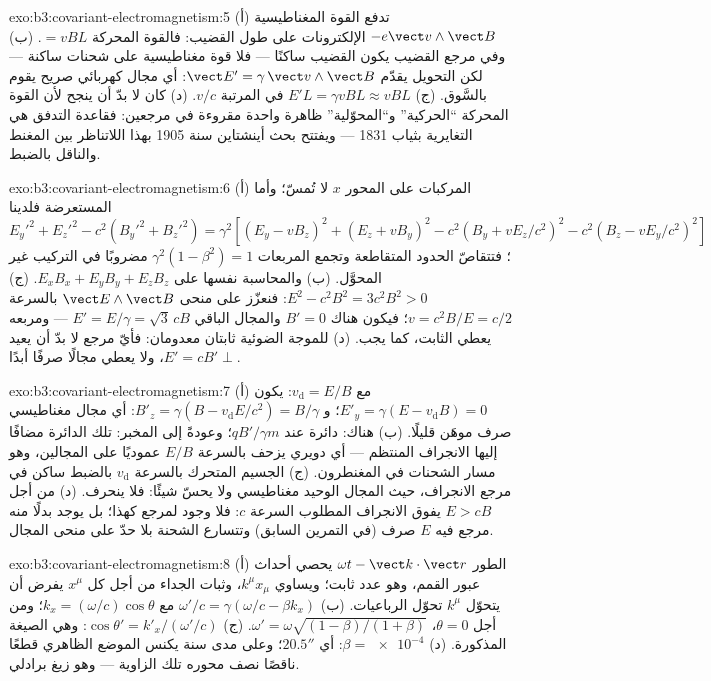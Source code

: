 \begin{solution}{exo:b3:covariant-electromagnetism:5}
(أ) تدفع القوة المغناطيسية $-e\vect v\wedge\vect B$ الإلكترونات
على طول القضيب: فالقوة المحركة $= vBL$. (ب) وفي مرجع القضيب يكون القضيب
ساكنًا --- فلا قوة مغناطيسية على شحنات ساكنة --- لكن
التحويل يقدّم $\vect E' = \gamma\,\vect v\wedge\vect B$:
أي مجال كهربائي صريح يقوم بالسَّوق. (ج) $E'L = \gamma vBL
\approx vBL$ في المرتبة $v/c$. (د) كان لا بدّ أن ينجح لأن القوة المحركة
``الحركية'' و``المحوّلية'' ظاهرة واحدة مقروءة في مرجعين:
فقاعدة التدفق هي التغايرية بثياب 1831 --- ويفتتح بحث أينشتاين
سنة 1905 بهذا اللاتناظر بين المغنط والناقل بالضبط.
\end{solution}

\begin{solution}{exo:b3:covariant-electromagnetism:6}
(أ) المركبات على المحور $x$ لا تُمسّ؛ وأما المستعرضة فلدينا
$E_y'^2 + E_z'^2 - c^2(B_y'^2 + B_z'^2) = \gamma^2[(E_y - vB_z)^2 +
(E_z + vB_y)^2 - c^2(B_y + vE_z/c^2)^2 - c^2(B_z - vE_y/c^2)^2]$؛
فتتقاصّ الحدود المتقاطعة وتجمع المربعات $\gamma^2(1 -
\beta^2) = 1$ مضروبًا في التركيب غير المحوَّل. (ب) والمحاسبة
نفسها على $E_xB_x + E_yB_y + E_zB_z$. (ج) $E^2 - c^2B^2 =
3c^2B^2 > 0$: فنعزّز على منحى $\vect E\wedge\vect B$ بالسرعة $v = c^2B/E =
c/2$؛ فيكون هناك $B' = 0$ والمجال الباقي $E' = E/\gamma =
\sqrt3\,cB$ --- ومربعه يعطي الثابت، كما يجب. (د) للموجة الضوئية ثابتان
معدومان: فأيّ مرجع لا بدّ أن يعيد $E' = cB' \perp$، ولا يعطي مجالًا صرفًا أبدًا.
\end{solution}

\begin{solution}{exo:b3:covariant-electromagnetism:7}
(أ) مع $v_{\text{d}} = E/B$: يكون $E'_y = \gamma(E - v_{\text{d}}B) =
0$؛ و $B'_z = \gamma(B - v_{\text{d}}E/c^2) = B/\gamma$: أي مجال
مغناطيسي صرف موهَن قليلًا. (ب) هناك: دائرة عند $qB'/\gamma m$؛ وعودةً
إلى المخبر: تلك الدائرة مضافًا إليها الانجراف المنتظم --- أي دويري يزحف
بالسرعة $E/B$ عموديًا على المجالين، وهو مسار الشحنات في
المغنطرون. (ج) الجسيم المتحرك بالسرعة $v_{\text{d}}$ بالضبط ساكن
في مرجع الانجراف، حيث المجال الوحيد مغناطيسي ولا
يحسّ شيئًا: فلا ينحرف. (د) من أجل $E > cB$ يفوق الانجراف المطلوب
السرعة $c$: فلا وجود لمرجع كهذا؛ بل يوجد بدلًا منه مرجع فيه $E$ صرف
(في التمرين السابق) وتتسارع الشحنة بلا حدّ
على منحى المجال.
\end{solution}

\begin{solution}{exo:b3:covariant-electromagnetism:8}
(أ) الطور $\omega t - \vect k\cdot\vect r$ يحصي أحداث عبور
القمم، وهو عدد ثابت؛ ويساوي $k^\mu x_\mu$، وثبات
الجداء من أجل كل $x^\mu$ يفرض أن يتحوّل $k^\mu$
تحوّل الرباعيات. (ب) $\omega'/c = \gamma(\omega/c -
\beta k_x)$ مع $k_x = (\omega/c)\cos\theta$؛ ومن أجل $\theta = 0$،
$\omega' = \omega\sqrt{(1-\beta)/(1+\beta)}$. (ج) $\cos\theta' =
k'_x/(\omega'/c)$: وهي الصيغة المذكورة. (د) $\beta = \num{e-4}$:
أي $20.5''$؛ وعلى مدى سنة يكنس الموضع الظاهري قطعًا ناقصًا نصف محوره
تلك الزاوية --- وهو زيغ برادلي.
\end{solution}

